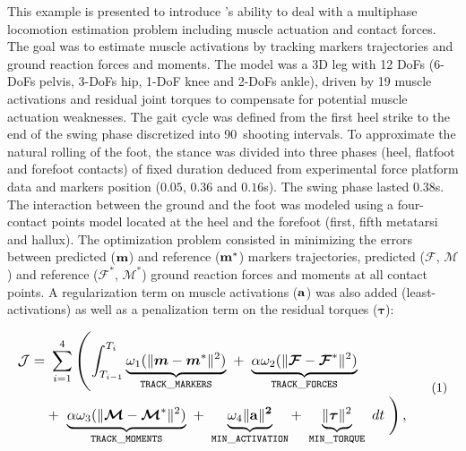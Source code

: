 This example is presented to introduce \bioptim's ability to deal with a multiphase locomotion estimation problem including muscle actuation and contact forces.
The goal was to estimate muscle activations by tracking markers trajectories and ground reaction forces and moments. 
The model was a 3D leg with 12 DoFs (6-DoFs pelvis, 3-DoFs hip, 1-DoF knee and 2-DoFs ankle), driven by 19 muscle activations and residual joint torques to compensate for potential muscle actuation weaknesses. 
The gait cycle was defined from the first heel strike to the end of the swing phase discretized into 90~shooting intervals. 
To approximate the natural rolling of the foot, the stance was divided into three phases (heel, flatfoot and forefoot contacts) of fixed duration deduced from experimental force platform data and markers position ($0.05$, $0.36$ and $0.16$\:s).
The swing phase lasted $0.38$\:s. 
The interaction between the ground and the foot was modeled using a four-contact points model located at the heel and the forefoot (first, fifth metatarsi and hallux).
The optimization problem consisted in minimizing the errors between predicted ($\bf{m}$) and reference ($\bf{m}^*$) markers trajectories, predicted ($\bm{\mathcal{F}}$, $\bm{\mathcal{M}}$) and reference ($\bm{\mathcal{F}^*}$, $\bm{\mathcal{M}}^*$) ground reaction forces and moments at all contact points.
A regularization term on muscle activations ($\bf{a}$) was also added (least-activations) as well as a penalization term on the residual torques ($\boldsymbol{\tau}$):

\[ 
\resizebox{0.9\columnwidth}{!}{$ 
\begin{aligned}
\mathcal{J} = &~\sum_{i=1}^4\left(\int_{T_{i-1}}^{T_i}\underbrace{\omega_1(\|\bm{m} - \bm{m}^*\|^{2})}_{\mathtt{TRACK\_MARKERS}}~ 
+ ~ \underbrace{\alpha\omega_2(\|\bm{\mathcal{F}} - \bm{\mathcal{F}}^*\|^{2})}_{\mathtt{TRACK\_FORCES}}\right.\\
&+ ~ \underbrace{\alpha\omega_3(\|\bm{\mathcal{M}} - \bm{\mathcal{M}}^*\|^{2})}_{\mathtt{TRACK\_MOMENTS}}~
+ ~ \underbrace{\omega_4\|\bf{a}\|^2}_{\mathtt{MIN\_ACTIVATION}}
+ ~ \underbrace{\|\boldsymbol{\tau}\|^2}_{\mathtt{MIN\_TORQUE}}~dt\left.\vphantom{\int_{T_{i-1}}^{T_i}}\right), 
\end{aligned}  
$}  
\addtag  
\label{eq:ocp_walk}  
\]

